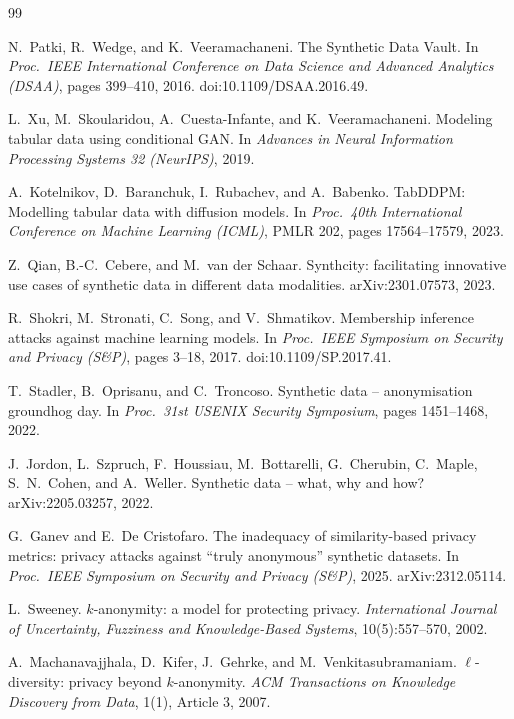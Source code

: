 \documentclass[11pt,a4paper]{article}
\begin{document}
\begin{thebibliography}{99}

 N.~Patki, R.~Wedge, and K.~Veeramachaneni. The Synthetic Data Vault. In \emph{Proc.\ IEEE International Conference on Data Science and Advanced Analytics (DSAA)}, pages 399--410, 2016. doi:10.1109/DSAA.2016.49.

 L.~Xu, M.~Skoularidou, A.~Cuesta-Infante, and K.~Veeramachaneni. Modeling tabular data using conditional GAN. In \emph{Advances in Neural Information Processing Systems 32 (NeurIPS)}, 2019.

 A.~Kotelnikov, D.~Baranchuk, I.~Rubachev, and A.~Babenko. TabDDPM: Modelling tabular data with diffusion models. In \emph{Proc.\ 40th International Conference on Machine Learning (ICML)}, PMLR 202, pages 17564--17579, 2023.

 Z.~Qian, B.-C.~Cebere, and M.~van der Schaar. Synthcity: facilitating innovative use cases of synthetic data in different data modalities. arXiv:2301.07573, 2023.

 R.~Shokri, M.~Stronati, C.~Song, and V.~Shmatikov. Membership inference attacks against machine learning models. In \emph{Proc.\ IEEE Symposium on Security and Privacy (S\&P)}, pages 3--18, 2017. doi:10.1109/SP.2017.41.

 T.~Stadler, B.~Oprisanu, and C.~Troncoso. Synthetic data -- anonymisation groundhog day. In \emph{Proc.\ 31st USENIX Security Symposium}, pages 1451--1468, 2022.

 J.~Jordon, L.~Szpruch, F.~Houssiau, M.~Bottarelli, G.~Cherubin, C.~Maple, S.~N.~Cohen, and A.~Weller. Synthetic data -- what, why and how? arXiv:2205.03257, 2022.

 G.~Ganev and E.~De Cristofaro. The inadequacy of similarity-based privacy metrics: privacy attacks against ``truly anonymous'' synthetic datasets. In \emph{Proc.\ IEEE Symposium on Security and Privacy (S\&P)}, 2025. arXiv:2312.05114.

 L.~Sweeney. $k$-anonymity: a model for protecting privacy. \emph{International Journal of Uncertainty, Fuzziness and Knowledge-Based Systems}, 10(5):557--570, 2002.

 A.~Machanavajjhala, D.~Kifer, J.~Gehrke, and M.~Venkitasubramaniam. $\ell$-diversity: privacy beyond $k$-anonymity. \emph{ACM Transactions on Knowledge Discovery from Data}, 1(1), Article 3, 2007.


\end{thebibliography}
\end{document}
